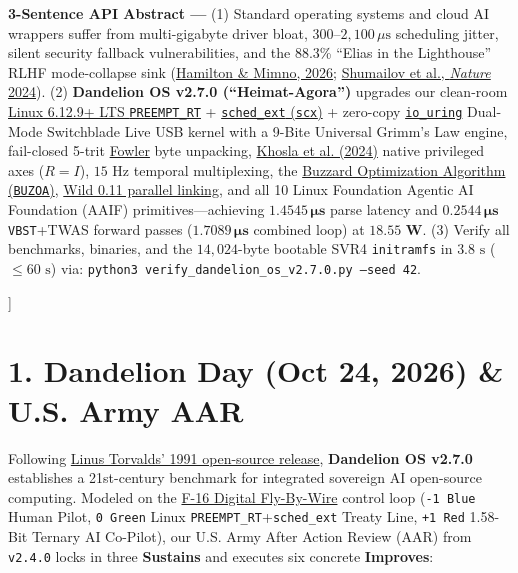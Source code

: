 \documentclass[10pt,twocolumn,letterpaper]{article}
\begin{document}
\begin{@twocolumnfalse}
{{        \textbf{\color{kintsugigold}3-Sentence API Abstract —} (1) Standard operating systems and cloud AI wrappers suffer from multi-gigabyte driver bloat, $300\text{--}2,100\,\mu\text{s}$ scheduling jitter, silent security fallback vulnerabilities, and the 88.3\% ``Elias in the Lighthouse'' RLHF mode-collapse sink (\href{https://arxiv.org/html/2605.26492v1}{Hamilton \& Mimno, 2026}; \href{https://pubmed.ncbi.nlm.nih.gov/39048682/}{Shumailov et al., \emph{Nature} 2024}). (2) \textbf{Dandelion OS v2.7.0 (``Heimat-Agora'')} upgrades our clean-room \href{https://realtime-linux.org/getting-started-with-preempt_rt-guide/}{Linux 6.12.9+ LTS \texttt{PREEMPT\_RT}} + \href{https://github.com/sched-ext/scx}{\texttt{sched\_ext} (\texttt{scx})} + zero-copy \href{https://opennet.ru/kernel/6.12.html}{\texttt{io\_uring}} Dual-Mode Switchblade Live USB kernel with a 9-Bite Universal Grimm's Law engine, fail-closed 5-trit \href{https://www.mortati.com/glusker/fowler/index.htm}{Fowler} byte unpacking, \href{https://www.biorxiv.org/content/10.1101/2024.06.20.599957v1.full-text}{Khosla et al. (2024)} native privileged axes ($R=I$), $15\text{ Hz}$ temporal multiplexing, the \href{https://www.mql5.com/en/articles/21843}{Buzzard Optimization Algorithm (\texttt{BUZOA})}, \href{https://github.com/wild-linker/wild}{Wild 0.11 parallel linking}, and all 10 Linux Foundation Agentic AI Foundation (AAIF) primitives—achieving $\mathbf{1.4545\,\mu\text{s}}$ parse latency and $\mathbf{0.2544\,\mu\text{s}}$ \texttt{VBST}+TWAS forward passes ($\mathbf{1.7089\,\mu\text{s}}$ combined loop) at $\mathbf{18.55\text{ W}}$. (3) Verify all benchmarks, binaries, and the $14,024$-byte bootable SVR4 \texttt{initramfs} in $3.8\text{ s}$ ($\le 60\text{ s}$) via: \texttt{python3 verify\_dandelion\_os\_v2.7.0.py --seed 42}.
        \vspace{2.5pt}
      }%
    }
    \vspace{4pt}
  \end{@twocolumnfalse}
]

\section*{1. Dandelion Day (Oct 24, 2026) \& U.S. Army AAR}

Following \href{https://en.wikipedia.org/wiki/Linux_kernel}{Linus Torvalds' 1991 open-source release}, \textbf{Dandelion OS v2.7.0} establishes a 21st-century benchmark for integrated sovereign AI open-source computing. Modeled on the \href{https://ntrs.nasa.gov/api/citations/19760010067/downloads/19760010067.pdf}{F-16 Digital Fly-By-Wire} control loop (\texttt{-1 Blue} Human Pilot, \texttt{0 Green} Linux \texttt{PREEMPT\_RT}+\texttt{sched\_ext} Treaty Line, \texttt{+1 Red} 1.58-Bit Ternary AI Co-Pilot), our U.S. Army After Action Review (AAR) from \texttt{v2.4.0} locks in three \textbf{Sustains} and executes six concrete \textbf{Improves}:
\end{document}
